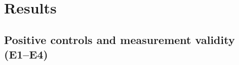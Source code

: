%




\section{Results}
\label{sec:results}

\subsection{Positive controls and measurement validity (E1--E4)}


